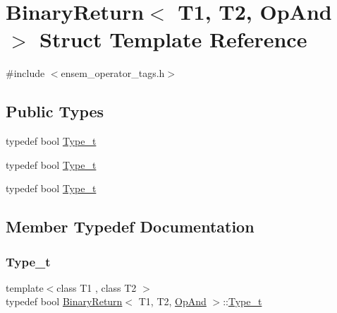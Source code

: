 \hypertarget{structBinaryReturn_3_01T1_00_01T2_00_01OpAnd_01_4}{}\section{Binary\+Return$<$ T1, T2, Op\+And $>$ Struct Template Reference}
\label{structBinaryReturn_3_01T1_00_01T2_00_01OpAnd_01_4}


{\ttfamily \#include $<$ensem\+\_\+operator\+\_\+tags.\+h$>$}

\subsection*{Public Types}
\begin{DoxyCompactItemize}
\item 
typedef bool \mbox{\hyperlink{structBinaryReturn_3_01T1_00_01T2_00_01OpAnd_01_4_a8eacc4b4e150e0f58ff37e1e48ff0649}{Type\+\_\+t}}
\item 
typedef bool \mbox{\hyperlink{structBinaryReturn_3_01T1_00_01T2_00_01OpAnd_01_4_a8eacc4b4e150e0f58ff37e1e48ff0649}{Type\+\_\+t}}
\item 
typedef bool \mbox{\hyperlink{structBinaryReturn_3_01T1_00_01T2_00_01OpAnd_01_4_a8eacc4b4e150e0f58ff37e1e48ff0649}{Type\+\_\+t}}
\end{DoxyCompactItemize}


\subsection{Member Typedef Documentation}
\mbox{\label{structBinaryReturn_3_01T1_00_01T2_00_01OpAnd_01_4_a8eacc4b4e150e0f58ff37e1e48ff0649}} 
\subsubsection{\texorpdfstring{Type\_t}{Type\_t}\hspace{0.1cm}{\footnotesize\ttfamily [1/3]}}
{\footnotesize\ttfamily template$<$class T1 , class T2 $>$ \\
typedef bool \mbox{\hyperlink{structBinaryReturn}{Binary\+Return}}$<$ T1, T2, \mbox{\hyperlink{structOpAnd}{Op\+And}} $>$\+::\mbox{\hyperlink{structBinaryReturn_3_01T1_00_01T2_00_01OpAnd_01_4_a8eacc4b4e150e0f58ff37e1e48ff0649}{Type\+\_\+t}}}

